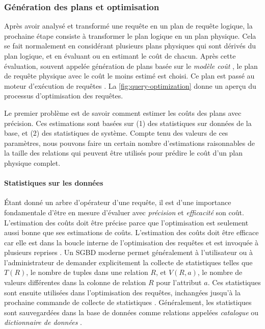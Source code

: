 \subsubsection{Génération des plans et optimisation}\label{sec:planningOptimisation}
Après avoir analysé et transformé une requête en un plan de requête logique, la prochaine étape consiste à transformer le plan logique en un plan physique. Cela se fait normalement en considérant plusieurs plans physiques qui sont dérivés du plan logique, et en évaluant ou en estimant le coût de chacun. Après cette évaluation, souvent appelée génération de plans basée sur le \textit{modèle coût} \cite{Selinger79}, le plan de requête physique avec le coût le moins estimé est choisi. Ce plan est passé au moteur d'exécution de requêtes \cite{GarciaMolina08}. La \ref{fig:query-optimization} donne un aperçu du processus d'optimisation des requêtes.

Le premier problème est de savoir comment estimer les coûts des plans avec précision. Ces estimations sont basées sur (1) des statistiques sur données de la base, et (2) des statistiques de système. Compte tenu des valeurs de ces paramètres, nous pouvons faire un certain nombre d'estimations raisonnables de la taille des relations qui peuvent être utilisés pour prédire le coût d'un plan physique complet.

\paragraph{Statistiques sur les données}
Étant donné un arbre d'opérateur d'une requête, il est d'une importance fondamentale d'être en mesure d'évaluer avec \textit{précision} et \textit{efficacité} son coût. L'estimation des coûts doit être précise parce que l'optimisation est seulement aussi bonne que ses estimations de coûts. L'estimation des coûts doit être efficace car elle est dans la boucle interne de l'optimisation des requêtes et est invoquée à plusieurs reprises \cite{Chaudhuri98}.
Un SGBD moderne permet généralement à l'utilisateur ou à l'administrateur de demander explicitement la collecte de statistiques telles que $T(R)$, le nombre de tuples dans une relation $R$, et $V(R, a)$, le nombre de valeurs différentes dans la colonne de relation $R$ pour l'attribut $a$. Ces statistiques sont ensuite utilisées dans l'optimisation des requêtes, inchangées jusqu'à la prochaine commande de collecte de statistiques \cite{GarciaMolina08}. Généralement, les statistiques sont sauvegardées dans la base de données comme relations appelées \textit{catalogue} ou \textit{dictionnaire de données} \cite{Elmasri08}.

